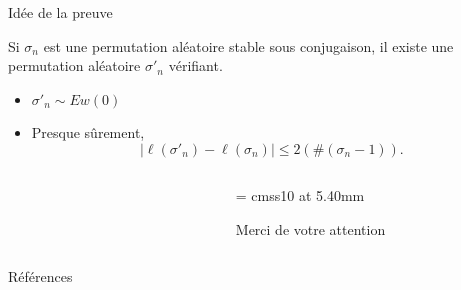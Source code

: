 \documentclass[english]{beamer}
\begin{document}
\begin{frame}{Idée de la preuve}
    \begin{lemma}
Si $\sigma_n$ est une permutation aléatoire stable sous conjugaison, il existe une permutation aléatoire $\sigma'_n$ vérifiant.
\begin{itemize}
    \item $\sigma'_n \sim Ew(0)$
    \item Presque sûrement, 
    \begin{equation*}
    |\ell(\sigma'_n)-\ell(\sigma_n)|\leq 2(\#(\sigma_n-1)).
    \end{equation*}
    
\end{itemize}
\end{lemma}
\end{frame}


\begin{frame}

  \begin{columns}
    \begin{column}{0.70\textwidth}
      \begin{center}
      \begin{figure}[ht]
    \centering
        \def\svgwidth{\columnwidth}
    
\end{figure}

      \end{center}
    \end{column}
    \begin{column}{0.30\textwidth}
      \begin{center}

        \font\endfont = cmss10 at 5.40mm
\color[rgb]{0.00,0.00,1.00}       \endfont 
        \baselineskip 7.0mm

        Merci de votre attention

      \end{center}    

    \end{column}
  \end{columns}

\end{frame}
\begin{frame}{Références}
\tiny


    

\end{frame}
\end{document}
